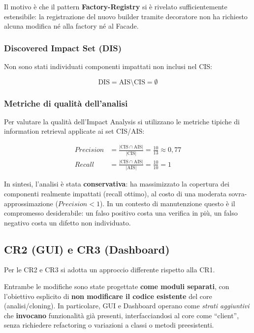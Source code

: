 \documentclass[11pt,a4paper]{article}
\newcommand{\CIS}{\textrm{CIS}}
\newcommand{\AIS}{\textrm{AIS}}
\newcommand{\DIS}{\textrm{DIS}}
\newcommand{\setempty}{\ensuremath{\emptyset}}
\begin{document}
Il motivo \`e che il pattern \textbf{Factory-Registry} si \`e rivelato
sufficientemente estensibile: la registrazione del nuovo builder tramite
decoratore non ha richiesto alcuna modifica n\'e alla factory n\'e al Facade.

\subsubsection*{Discovered Impact Set (DIS)}

Non sono stati individuati componenti impattati non inclusi nel CIS:

\begin{equation*}
  \DIS = \AIS \setminus \CIS = \setempty
\end{equation*}

\subsubsection{Metriche di qualit\`a dell'analisi}
\label{sec:ia-cr1-metriche}

Per valutare la qualit\`a dell'Impact Analysis si utilizzano le metriche tipiche
di information retrieval applicate ai set CIS/AIS:

\begin{align}
  \mathit{Precision} &= \frac{|\CIS \cap \AIS|}{|\CIS|}
                      = \frac{10}{13} \approx 0{,}77 \label{eq:precision}\\[4pt]
  \mathit{Recall}    &= \frac{|\CIS \cap \AIS|}{|\AIS|}
                      = \frac{10}{10} = 1 \label{eq:recall}
\end{align}

In sintesi, l'analisi \`e stata \textbf{conservativa}: ha massimizzato la
copertura dei componenti realmente impattati (recall ottimo), al costo di una
moderata sovra-approssimazione ($\mathit{Precision} < 1$). In un contesto di
manutenzione questo \`e il compromesso desiderabile: un falso positivo costa una
verifica in pi\`u, un falso negativo costa un difetto non individuato.

\subsection{CR2 (GUI) e CR3 (Dashboard)}
\label{sec:ia-cr23}

Per le CR2 e CR3 si adotta un approccio differente rispetto alla CR1.

Entrambe le modifiche sono state progettate \textbf{come moduli separati}, con
l'obiettivo esplicito di \textbf{non modificare il codice esistente} del core
(analisi/cloning). In particolare, GUI e Dashboard operano come \emph{strati
aggiuntivi} che \textbf{invocano} funzionalit\`a gi\`a presenti,
interfacciandosi al core come ``client'', senza richiedere refactoring o
variazioni a classi o metodi preesistenti.
\end{document}
